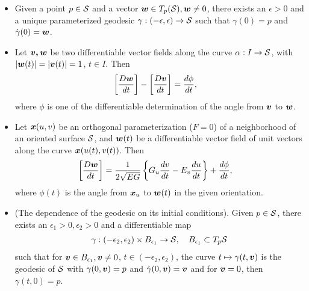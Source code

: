 \documentclass[11pt]{article}
\begin{document}
\begin{itemize}
\item \begin{proposition}\label{prop: geo_unique}
Given a point $p\in {\mathcal S}$ and a vector $\boldsymbol{w}\in T_{p}({\mathcal S}), \boldsymbol{w}\neq 0$, there exists an $\epsilon>0$ and a unique parameterized geodesic $\gamma: (-\epsilon, \epsilon) \rightarrow {\mathcal S}$ such that $\gamma(0)=p$ and $\dot{\gamma}(0) = \boldsymbol{w}$.
\end{proposition}\vspace{15pt}

\item \begin{lemma} \label{lem: cov_deriv_angle}
Let $\boldsymbol{v,w}$ be two differentiable vector fields along the curve $\alpha: I \rightarrow {\mathcal S}$, with $\left\lvert \boldsymbol{w}(t) \right\rvert = \left\lvert \boldsymbol{v}(t) \right\rvert = 1$, $t\in I$. Then 
\begin{align*}
\left[\frac{D\boldsymbol{w}}{dt}\right] - \left[\frac{D\boldsymbol{v}}{dt}\right] &= \frac{d\phi}{dt},
\end{align*}
where $\phi$ is one of the differentiable determination of the angle from $\boldsymbol{v}$ to $\boldsymbol{w}$.
\end{lemma}

\item \begin{proposition}\label{prop: alg_value_angle}
Let $\boldsymbol{x}(u,v)$ be an orthogonal parameterization ($F=0$) of a neighborhood of an oriented surface ${\mathcal S}$, and $\boldsymbol{w}(t)$ be a differentiable vector field of unit vectors along the curve $\boldsymbol{x}(u(t), v(t))$. Then 
\begin{align*}
\left[\frac{D\boldsymbol{w}}{dt}\right] &= \frac{1}{2\sqrt{EG}}\left\{G_{u}\frac{dv}{dt} - E_{v}\frac{du}{dt} \right\} +  \frac{d\phi}{dt},
\end{align*}
where $\phi(t)$ is the angle from $\boldsymbol{x}_{u}$ to $\boldsymbol{w}(t)$ in the given orientation. 
\end{proposition}\vspace{10pt}

 \item \begin{theorem}\label{thm: exp_map_unique}
(The dependence of the geodesic on its initial conditions). Given $p\in {\mathcal S}$, there exists an $\epsilon_{1}>0, \epsilon_{2}>0$ and a differentiable map 
\begin{align*}
\gamma: (-\epsilon_{2}, \epsilon_{2}) \times B_{\epsilon_{1}} \rightarrow {\mathcal S}, \quad  B_{\epsilon_{1}}\subset T_{p}{\mathcal S}
\end{align*}
such that for $\boldsymbol{v}\in B_{\epsilon_{1}}, \boldsymbol{v}\neq 0$, $t\in (-\epsilon_{2}, \epsilon_{2})$, the curve $t\mapsto \gamma(t,\boldsymbol{v})$ is the geodesic of ${\mathcal S}$ with $\gamma(0,\boldsymbol{v}) = p$ and $\dot{\gamma}(0,\boldsymbol{v}) = \boldsymbol{v}$ and for $\boldsymbol{v} =0$, then $\gamma(t,0) = p$.
\end{theorem}


\end{itemize}
\end{document}
